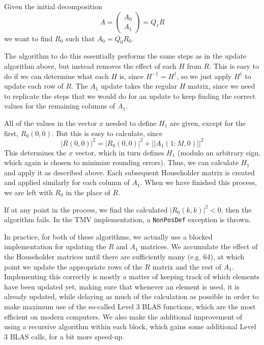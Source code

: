 \documentclass[twoside,letterpaper,11pt]{article}
\renewcommand{\tt}[1]{{\lstinline {#1}}}
\begin{document}
Given the initial decomposition
\begin{equation*}
A = \left(\begin{array}{c}A_0 \\ A_1 \end{array}\right) = Q_1 R 
\end{equation*}
we want to find $R_0$ such that $A_0 = Q_0 R_0$.

The algorithm to do this essentially performs the same steps as in the update
algorithm above,
but instead removes the effect of each $H$ from $R$.
This is easy to
do if we can determine what each $H$ is, since $H^{-1} = H^\dagger$, so we just
apply $H^\dagger$ to update each row of $R$.  The $A_1$ update takes
the regular $H$ matrix, since we need to replicate the steps that we would do
for an update to keep finding the correct values for the remaining columns of $A_1$.

All of the values in the vector $x$ needed to define $H_1$ are given, except for the first,
$R_0(0,0)$.  But this is easy to calculate, since
\begin{equation*}
|R(0,0)|^2 = |R_0(0,0)|^2 + ||A_1(1:M,0)||^2
\end{equation*}
This determines the $x$ vector, which in turn defines $H_1$
(modulo an arbitrary sign, which again is chosen to minimize rounding errors).
Thus, we can calculate $H_1$ and apply it as described above.  Each subsequent Householder
matrix is created and applied similarly for each column of $A_1$.  When we have finished
this process, we are left with $R_0$ in the place of $R$.

If at any point in the process, we find the calculated $|R_0(k,k)|^2 < 0$, then 
the algorithm fails.  In the TMV implementation, a \tt{NonPosDef} exception is thrown.

In practice, for both of these algorithms, we actually use a blocked implementation for updating
the $R$ and $A_1$ matrices.  We accumulate the effect of the Householder matrices until 
there are sufficiently many (e.g. 64), at which point we update the appropriate rows of the $R$
matrix and the rest of $A_1$.  Implementing this correctly is mostly a matter of keeping track
of which elements have been updated yet, making sure that whenever an element is used,
it is already updated, while delaying as much of the calculation as possible in order 
to make maximum
use of the so-called Level 3 BLAS functions, which are the most efficient on modern computers.
We also make the additional improvement of using a recursive algorithm within each block,
which gains some additional Level 3 BLAS calls, for a bit more speed-up.
\end{document}
